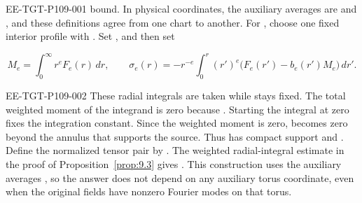 %
\begin{EESegment}{EE-TGT-P109-001}
bound. In physical coordinates, the auxiliary averages are
 and
, and these definitions agree from one
chart to another. For , choose one fixed interior profile
 with
. Set
, and then set
\end{EESegment}
\[
 M_e=\int_0^\infty r^eF_e(r)\,dr,
 \qquad
 \sigma_e(r)=-r^{-e}\int_0^r(r')^e\bigl(F_e(r')-b_e(r')M_e\bigr)\,dr'.
\]
\begin{EESegment}{EE-TGT-P109-002}
These radial integrals are taken while  stays fixed. The total weighted
moment of the integrand is zero because
. Starting the integral at zero fixes
the integration constant. Since the weighted moment is zero, 
becomes zero beyond the annulus that supports the source. Thus
 has compact support and
. Define the normalized tensor pair by
. The weighted radial-integral estimate in
the proof of Proposition~\ref{prop:9.3} gives
. This construction uses the auxiliary
averages , so the answer does not depend on any auxiliary torus
coordinate, even when the original fields have nonzero Fourier modes on that torus.
\end{EESegment}

